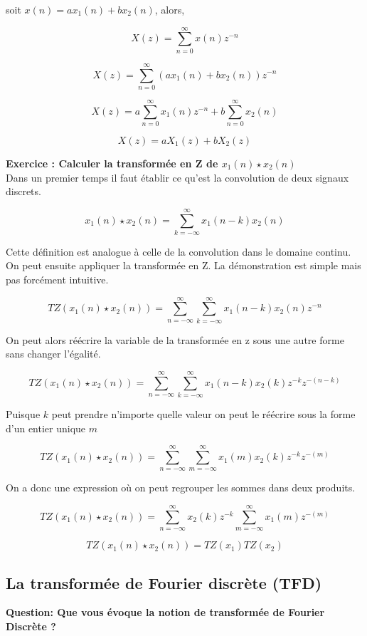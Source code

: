 \documentclass[11pt,a4paper]{article}
\begin{document}
soit $x(n) = a x_1(n) + b x_2(n)$, alors,

\[X(z) = \sum_{n = 0}^{\infty} x(n) z^{-n}\] 

\[X(z) = \sum_{n = 0}^{\infty} (a x_1(n) + b x_2(n)) z^{-n}\] 

\[X(z) = a \sum_{n = 0}^{\infty} x_1(n)  z^{-n} + b \sum_{n = 0}^{\infty} x_2(n) \] 

\[X(z) = a X_1(z)+ b X_2(z) \] 

\textbf{Exercice : Calculer la transformée en Z de $x_1(n) \star x_2(n)$}\\

Dans un premier temps il faut établir ce qu'est la convolution  de deux signaux discrets.

\[ x_1(n) \star x_2(n)=  \sum_{k = -\infty}^{\infty} x_1(n-k)x_2(n) \]

Cette définition est analogue à celle de la convolution dans le domaine continu. On peut ensuite appliquer la transformée en Z. La démonstration est simple mais pas forcément intuitive.

\[ TZ(x_1(n) \star x_2(n)) = \sum_{n = -\infty}^{\infty} \sum_{k = -\infty}^{\infty} x_1(n-k)x_2(n) z^{-n}\]

On peut alors réécrire la variable de la transformée en z sous une autre forme sans changer l'égalité.

\[ TZ(x_1(n) \star x_2(n)) = \sum_{n = -\infty}^{\infty} \sum_{k = -\infty}^{\infty} x_1(n-k)x_2(k) z^{-k}  z^{-(n-k)}\]

Puisque $k$ peut prendre n'importe quelle valeur on peut le réécrire sous la forme d'un entier unique $m$ 

\[ TZ(x_1(n) \star x_2(n)) = \sum_{n = -\infty}^{\infty} \sum_{m = -\infty}^{\infty} x_1(m)x_2(k) z^{-k}  z^{-(m)}\]

On a donc une expression où on peut regrouper les sommes dans deux produits.

\[ TZ(x_1(n) \star x_2(n)) = \sum_{n = -\infty}^{\infty} x_2(k)z^{-k} \sum_{m = -\infty}^{\infty} x_1(m)   z^{-(m)}\]

\[ TZ(x_1(n) \star x_2(n)) = TZ(x_1) TZ(x_2)\]

\subsection{La transformée de Fourier discrète (TFD)}

\textbf{Question: Que vous évoque la notion de transformée de Fourier Discrète ?}\\
\end{document}
